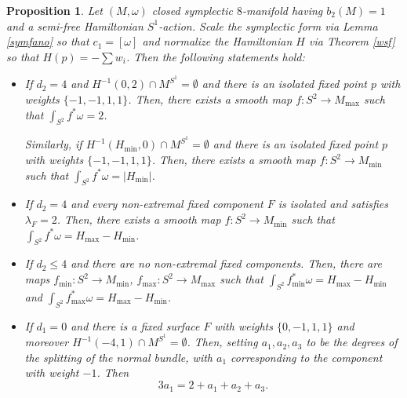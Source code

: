 \documentclass[12pt]{article}
\newtheorem{proposition}[theorem]{Proposition}
\begin{document}
\begin{proposition} \label{spheremaps}
Let $(M,\omega)$ closed symplectic $8$-manifold having $b_{2}(M) =1$ and a semi-free Hamiltonian $S^1$-action. Scale the symplectic form via Lemma \ref{symfano} so that $c_1 = [\omega]$ and normalize the Hamiltonian $H$  via Theorem \ref{wsf} so that $H(p) = -\sum w_i$.  Then the following statements hold:
\begin{itemize}
\item[a).] If $d_2=4$ and $H^{-1}(0,2) \cap M^{S^1} = \emptyset$ and there is an isolated fixed point $p$ with weights $\{-1,-1,1,1\}$. Then, there exists a smooth map $f: S^2 \rightarrow M_{\max}$ such that $\int_{S^2} f^{*}\omega = 2$.

Similarly, if $H^{-1}(H_{\min},0) \cap M^{S^1} = \emptyset$ and there is an isolated fixed point $p$ with weights $\{-1,-1,1,1\}$. Then, there exists a smooth map $f: S^2 \rightarrow M_{\min}$ such that $\int_{S^2} f^{*}\omega = |H_{\min}|$.
\item[b).]  If $d_2=4$ and every non-extremal fixed component $F$ is isolated and satisfies $\lambda_{F}=2$. Then, there exists a smooth map $f: S^2 \rightarrow M_{\min}$ such that $\int_{S^2} f^{*}\omega = H_{\max} - H_{\min}$.

\item[c).] If $ d_2 \leq 4$ and there are no non-extremal fixed components. Then, there are maps $f_{\min} : S^2 \rightarrow M_{\min}$,   $f_{\max}: S^2 \rightarrow M_{\max}$ such that $\int_{S^2} f_{\min}^{*}\omega = H_{\max} - H_{\min}$ and $\int_{S^2} f_{\max}^{*}\omega = H_{\max} - H_{\min}$.

\item[d).] If $d_1=0$ and there is a fixed surface $F$ with weights $\{0,-1,1,1\}$ and moreover $H^{-1}(-4,1) \cap M^{S^1} = \emptyset$. Then, setting $a_1,a_2,a_3$ to be the degrees of the splitting of the normal bundle, with $a_1$ corresponding to the component with weight $-1$. Then $$3a_1 = 2 + a_1  + a_2 + a_3 .$$
\end{itemize}
\end{proposition}
\end{document}
